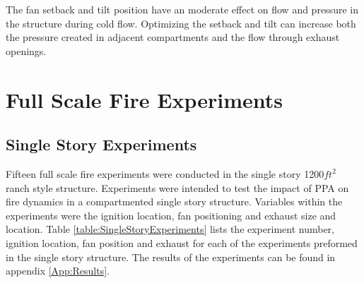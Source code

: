 \documentclass{article}
\begin{document}
The fan setback and tilt position have an moderate effect on flow and pressure in the structure during cold flow. Optimizing the setback and tilt can increase both the pressure created in adjacent compartments and the flow through exhaust openings. 

\section{Full Scale Fire Experiments}

\subsection{Single Story Experiments} \label{SingleStoryExp}

Fifteen full scale fire experiments were conducted in the single story 1200$ft^2$ ranch style structure. Experiments were intended to test the impact of PPA on fire dynamics in a compartmented single story structure. Variables within the experiments were the ignition location, fan positioning and exhaust size and location. Table \ref{table:SingleStoryExperiments} lists the experiment number, ignition location, fan position and exhaust for each of the experiments preformed in the single story structure. The results of the experiments can be found in appendix \ref{App:Results}.

\mbox{}
\end{document}
